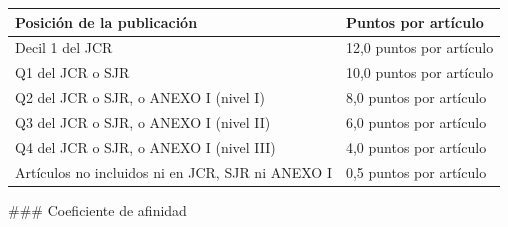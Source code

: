 \documentclass{article}
\begin{document}
\begin{itemize}
\begin{itemize}
                        \vspace{0.4cm}
                        \begin{table}[h!]\centering\renewcommand{\arraystretch}{1.3}
                              \begin{tabular}{|p{}|p{}|}\hline
                                    Posición de la publicación                       & Puntos por artículo      \\\hline
                                    Decil 1 del JCR                                  & 12,0 puntos por artículo \\\hline
                                    Q1 del JCR o SJR                                 & 10,0 puntos por artículo \\\hline
                                    Q2 del JCR o SJR, o ANEXO I (nivel I)            & 8,0 puntos por artículo  \\\hline
                                    Q3 del JCR o SJR, o ANEXO I (nivel II)           & 6,0 puntos por artículo  \\\hline
                                    Q4 del JCR o SJR, o ANEXO I (nivel III)          & 4,0 puntos por artículo  \\\hline
                                    Artículos no incluidos ni en JCR, SJR ni ANEXO I & 0,5 puntos por artículo  \\\hline
                              \end{tabular}\end{table}
                        \vspace{0.4cm}

                        \#\#\# Coeficiente de afinidad


\end{itemize}
\end{itemize}
\end{document}

